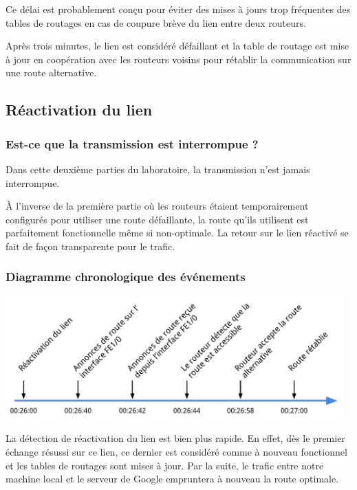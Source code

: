 \documentclass[11pt,a4paper]{article}
\begin{document}
Ce délai est probablement conçu pour éviter des mises à jours trop fréquentes des tables de routages en cas de coupure brève du lien entre deux routeurs.

Après trois minutes, le lien est considéré défaillant et la table de routage est mise à jour en coopération avec les routeurs voisins pour rétablir la communication sur une route alternative.

\subsection{Réactivation du lien}

\subsubsection*{Est-ce que la transmission est interrompue ?}

Dans cette deuxième parties du laboratoire, la transmission n'est jamais interrompue.

À l'inverse de la première partie où les routeurs étaient temporairement configurés pour utiliser une route défaillante, la route qu'ils utilisent est parfaitement fonctionnelle même si non-optimale. La retour sur le lien réactivé se fait de façon transparente pour le trafic.

\subsubsection*{Diagramme chronologique des événements}

\begin{center}
\includegraphics[width=13cm]{img_up}
\end{center}

La détection de réactivation du lien est bien plus rapide. En effet, dès le premier échange résussi sur ce lien, ce dernier est considéré comme à nouveau fonctionnel et les tables de routages sont mises à jour. Par la suite, le trafic entre notre machine local et le serveur de Google empruntera à nouveau la route optimale.
\end{document}
